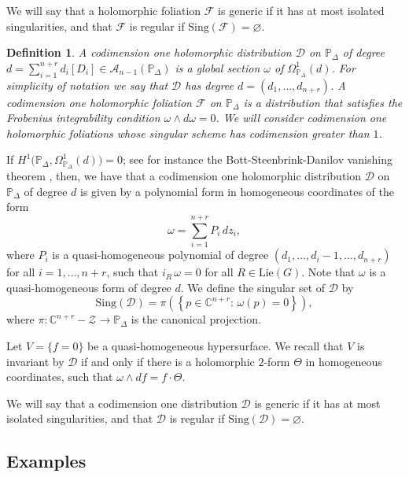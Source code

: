 \documentclass[11pt]{amsart}
\theoremstyle{plain}
\newtheorem{defi}{Definition}[section]
\theoremstyle{definition}
\begin{document}
We will say that a holomorphic foliation $\mathcal{F}$ is generic if it has at most isolated singularities, 
and that $\mathcal{F}$ is regular if $\mathrm{Sing}(\mathcal{F})=\varnothing$. 

\begin{defi} 
A codimension one holomorphic distribution $\mathcal{D}$ on $\mathbb{P}_{\Delta}$ of degree 
$d=\sum_{i=1}^{n+r}d_{i}\left[D_{i}\right]\in\mathcal{A}_{n-1}(\mathbb{P}_{\Delta})$
is a global section $\omega$ of $\Omega^1_{\mathbb{P}_{\Delta}}(d)$.  
For simplicity of notation we say that $\mathcal{D}$ has degree $d=(d_1,\dots,d_{n+r})$.
A codimension one holomorphic foliation $\mathcal{F}$ on $\mathbb{P}_{\Delta}$ is a distribution that satisfies 
the Frobenius integrability condition $\omega\wedge d\omega=0$.
We will consider codimension one holomorphic foliations whose singular scheme has codimension greater than $1$.
\end{defi}

If $H^1\big(\mathbb{P}_{\Delta}, \Omega^1_{\mathbb{P}_{\Delta}}(d)\big)=0$; see for instance the Bott-Steenbrink-Danilov vanishing theorem
\cite[Theorem $9.3.1$]{Cox2}, then, we have that a codimension one holomorphic distribution $\mathcal{D}$ on
$\mathbb{P}_{\Delta}$ of degree $d$ is given by a polynomial form in homogeneous coordinates of the form
$$
\omega=\sum_{i=1}^{n+r}P_i \, dz_i,
$$
where $P_i$ is a quasi-homogeneous polynomial of degree $(d_1,\dots,d_i-1,\dots,d_{n+r})$ for all $i=1,\dots,n+r$, such that
$i_R \, \omega=0$ for all $R\in\mathrm{Lie}(G)$. 
Note that $\omega$ is a quasi-homogeneous form of degree $d$. We define the singular set of $\mathcal{D}$ by 
$$\mathrm{Sing}(\mathcal{D})=\pi\left(\left\{p\in\mathbb{C}^{n+r}:\,\omega(p)=0\right\}\right),$$
where $\pi:\mathbb{C}^{n+r}-{\mathcal{Z}} \rightarrow \mathbb{P}_{\Delta}$ is the canonical projection. 

Let $V = \{f = 0\}$ be a quasi-homogeneous hypersurface. We recall that $V$ is invariant by $\mathcal{D}$ if and only if 
there is a holomorphic $2$-form $\Theta$ in homogeneous coordinates, such that $\omega\wedge d f = f\cdot\Theta$. 

We will say that a codimension one distribution $\mathcal{D}$ 
is generic if it has at most isolated singularities, 
and that $\mathcal{D}$ is regular if $\mathrm{Sing}(\mathcal{D})=\varnothing$. 

\subsection{Examples}
\end{document}
